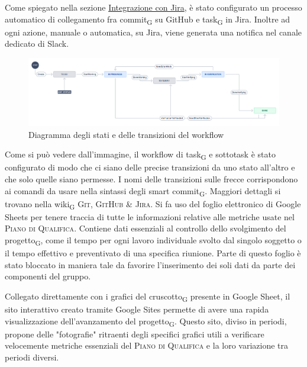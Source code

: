         Come spiegato nella sezione \hyperref[jiraintegration]{Integrazione con Jira}, è stato configurato un processo automatico di collegamento fra commit\textsubscript{G} su GitHub e task\textsubscript{G} in Jira. Inoltre ad ogni azione, manuale o automatica, su Jira, viene generata una notifica nel canale dedicato di Slack.
        \begin{figure}[H]
            \centering
            \includegraphics[scale=0.32]{res/images/jira_workflow.png}
            \caption{Diagramma degli stati e delle transizioni del workflow}
        \end{figure}
            Come si può vedere dall'immagine, il workflow di task\textsubscript{G} e sottotask è stato configurato di modo che ci siano delle precise transizioni da uno stato all'altro e che solo quelle siano permesse. I nomi delle transizioni sulle frecce corrispondono ai comandi da usare nella sintassi degli smart commit\textsubscript{G}. Maggiori dettagli si trovano nella wiki\textsubscript{G} \textsc{Git, GitHub \& Jira}.
        Si fa uso del foglio elettronico di Google Sheets per tenere traccia di tutte le informazioni relative alle metriche usate nel \textsc{Piano di Qualifica}. Contiene dati essenziali al controllo dello svolgimento del progetto\textsubscript{G}, come il tempo per ogni lavoro individuale svolto dal singolo soggetto o il tempo effettivo e preventivato di una specifica riunione. Parte di questo foglio è stato bloccato in maniera tale da favorire l'inserimento dei soli dati da parte dei componenti del gruppo.

        Collegato direttamente con i grafici del cruscotto\textsubscript{G} presente in Google Sheet, il sito interattivo creato tramite Google Sites permette di avere una rapida visualizzazione dell'avanzamento del progetto\textsubscript{G}. Questo sito, diviso in periodi, propone delle "fotografie" ritraenti degli specifici grafici utili a verificare velocemente metriche essenziali del \textsc{Piano di Qualifica} e la loro variazione tra periodi diversi.

